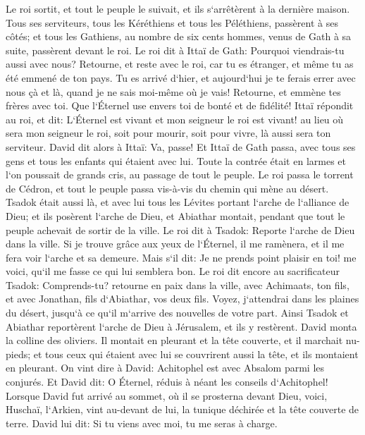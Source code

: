 \verse Le roi sortit, et tout le peuple le suivait, et ils s`arrêtèrent à la dernière maison. 
\verse Tous ses serviteurs, tous les Kéréthiens et tous les Péléthiens, passèrent à ses côtés; et tous les Gathiens, au nombre de six cents hommes, venus de Gath à sa suite, passèrent devant le roi. 
\verse Le roi dit à Ittaï de Gath: Pourquoi viendrais-tu aussi avec nous? Retourne, et reste avec le roi, car tu es étranger, et même tu as été emmené de ton pays. 
\verse Tu es arrivé d`hier, et aujourd`hui je te ferais errer avec nous çà et là, quand je ne sais moi-même où je vais! Retourne, et emmène tes frères avec toi. Que l`Éternel use envers toi de bonté et de fidélité! 
\verse Ittaï répondit au roi, et dit: L`Éternel est vivant et mon seigneur le roi est vivant! au lieu où sera mon seigneur le roi, soit pour mourir, soit pour vivre, là aussi sera ton serviteur. 
\verse David dit alors à Ittaï: Va, passe! Et Ittaï de Gath passa, avec tous ses gens et tous les enfants qui étaient avec lui. 
\verse Toute la contrée était en larmes et l`on poussait de grands cris, au passage de tout le peuple. Le roi passa le torrent de Cédron, et tout le peuple passa vis-à-vis du chemin qui mène au désert. 
\verse Tsadok était aussi là, et avec lui tous les Lévites portant l`arche de l`alliance de Dieu; et ils posèrent l`arche de Dieu, et Abiathar montait, pendant que tout le peuple achevait de sortir de la ville. 
\verse Le roi dit à Tsadok: Reporte l`arche de Dieu dans la ville. Si je trouve grâce aux yeux de l`Éternel, il me ramènera, et il me fera voir l`arche et sa demeure. 
\verse Mais s`il dit: Je ne prends point plaisir en toi! me voici, qu`il me fasse ce qui lui semblera bon. 
\verse Le roi dit encore au sacrificateur Tsadok: Comprends-tu? retourne en paix dans la ville, avec Achimaats, ton fils, et avec Jonathan, fils d`Abiathar, vos deux fils. 
\verse Voyez, j`attendrai dans les plaines du désert, jusqu`à ce qu`il m`arrive des nouvelles de votre part. 
\verse Ainsi Tsadok et Abiathar reportèrent l`arche de Dieu à Jérusalem, et ils y restèrent. 
\verse David monta la colline des oliviers. Il montait en pleurant et la tête couverte, et il marchait nu-pieds; et tous ceux qui étaient avec lui se couvrirent aussi la tête, et ils montaient en pleurant. 
\verse On vint dire à David: Achitophel est avec Absalom parmi les conjurés. Et David dit: O Éternel, réduis à néant les conseils d`Achitophel! 
\verse Lorsque David fut arrivé au sommet, où il se prosterna devant Dieu, voici, Huschaï, l`Arkien, vint au-devant de lui, la tunique déchirée et la tête couverte de terre. 
\verse David lui dit: Si tu viens avec moi, tu me seras à charge. 
